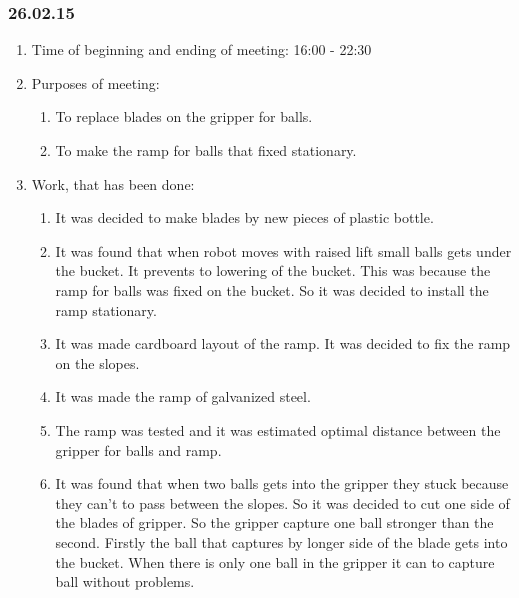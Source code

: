 \subsubsection{26.02.15}

\begin{enumerate}
	\item Time of beginning and ending of meeting:
	16:00 - 22:30
	\item Purposes of meeting:
	\begin{enumerate}
		\item To replace blades on the gripper for balls.
		
		\item To make the ramp for balls that fixed stationary.
	  
    \end{enumerate}
   
	\item Work, that has been done:
	\begin{enumerate}
		 
		 \item It was decided to make blades by new pieces of plastic bottle.
		 
		 \item It was found that when robot moves with raised lift small balls gets under the bucket. It prevents to lowering of the bucket. This was because the ramp for balls was fixed on the bucket. So it was decided to install the ramp stationary.
		 
		 \item It was made cardboard layout of the ramp. It was decided to fix the ramp on the slopes. 
		 
		 \item It was made the ramp of galvanized steel.
		 
		 \item The ramp was tested and it was estimated optimal distance between the gripper for balls and ramp.
		 
		 \item It was found that when two balls gets into the gripper they stuck because they can't to pass between the slopes. So it was decided to cut one side of the blades of gripper. So the gripper capture one ball stronger than the second. Firstly the ball that captures by longer side of the blade gets into the bucket. When there is only one ball in the gripper it can to capture ball without problems.
		 

\end{enumerate}
\end{enumerate}
